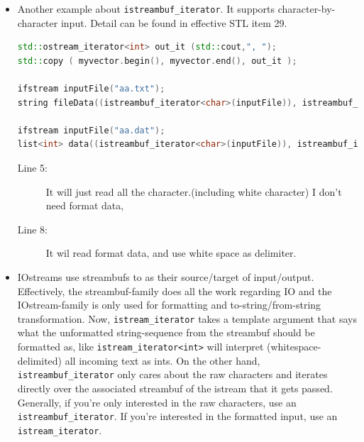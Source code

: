 \documentclass[a4paper,11pt,twoside]{book}
\begin{document}
\begin{itemize}
	\item Another example about \texttt{istreambuf\_iterator}. It supports character-by-character input. Detail can be found in effective STL item 29.
\begin{lstlisting}[frame=single, language=c++, basicstyle=\scriptsize]
std::ostream_iterator<int> out_it (std::cout,", ");
std::copy ( myvector.begin(), myvector.end(), out_it );

ifstream inputFile("aa.txt");
string fileData((istreambuf_iterator<char>(inputFile)), istreambuf_iterator<char>());

ifstream inputFile("aa.dat");
list<int> data((istreambuf_iterator<char>(inputFile)), istreambuf_iterator<char>());
\end{lstlisting}
\begin{description}
	\item[Line 5:] It will just read all the character.(including white character) I don't need format data,
	\item[Line 8:] It wil  read format data, and use white space as delimiter.
\end{description}

	\item IOstreams use streambufs to as their source/target of input/output. Effectively, the streambuf-family does all the work regarding IO and the IOstream-family is only used for formatting and to-string/from-string transformation. Now, \texttt{istream\_iterator} takes a template argument that says what the unformatted string-sequence from the streambuf should be formatted as, like \texttt{istream\_iterator<int>} will interpret (whitespace-delimited) all incoming text as ints. On the other hand, \texttt{istreambuf\_iterator} only cares about the raw characters and iterates directly over the associated streambuf of the istream that it gets passed. Generally, if you're only interested in the raw characters, use an \texttt{istreambuf\_iterator}. If you're interested in the formatted input, use an \texttt{istream\_iterator}.

\end{itemize}
\end{document}
